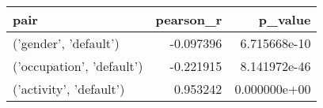 \begin{tabular}{lrr}
\toprule
                     pair &  pearson\_r &      p\_value \\
\midrule
    ('gender', 'default') &  -0.097396 & 6.715668e-10 \\
('occupation', 'default') &  -0.221915 & 8.141972e-46 \\
  ('activity', 'default') &   0.953242 & 0.000000e+00 \\
\bottomrule
\end{tabular}
